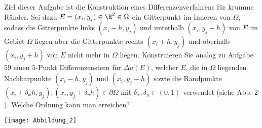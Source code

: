 \begin{exercise}
  Ziel dieser Aufgabe ist die Konstruktion eines Differenzenverfahrens für krumme
  Ränder. Sei dazu $E =(x_i, y_j) \in \R^2 \in \Omega$ ein Gitterpunkt im Inneren
  von $\Omega$, sodass die Gitterpunkte links $(x_i -h, y_j)$ und unterhalb
  $(x_i,y_j -h)$ von $E$ im Gebiet $\Omega$ liegen aber die Gitterpunkte rechts
  $(x_i + h, y_j)$ und oberhalb $(x_i, y_j + h)$ von $E$ nicht mehr in $\Omega$ liegen.
  Konstruieren Sie analog zu Aufgabe $59$ einen $5$-Punkt Differenzenstern für
  $\Delta u(E)$, welcher $E$, die in $\Omega$ liegenden Nachbarpunkte $(x_i -h, y_j)$
  und $(x_i, y_j -h)$ sowie die Randpunkte
  $(x_i + \delta_x h , y_j), (x_i, y_j + \delta_y h) \in \partial \Omega$ mit
  $\delta_x, \delta_y \in (0,1)$ verwendet (siehe Abb. $2$). Welche Ordnung kann man
  erreichen?

  \texttt{[image: Abbildung\_2]}
\end{exercise}

